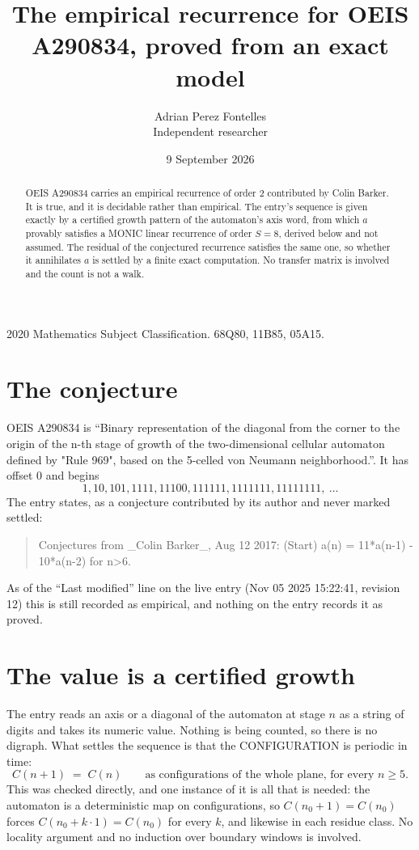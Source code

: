 \documentclass[11pt,a4paper]{article}
\title{The empirical recurrence for OEIS A290834, proved from an exact model}
\author{Adrian Perez Fontelles\\ \small Independent researcher}
\date{9 September 2026}
\theoremstyle{plain}
\theoremstyle{definition}
\begin{document}
\maketitle

\begin{abstract}
OEIS A290834 carries an empirical recurrence of order $2$ contributed by Colin Barker. It is true, and it is
decidable rather than empirical. The entry's sequence is given exactly by a certified growth pattern of the automaton's axis word, from
which $a$ provably satisfies a MONIC linear recurrence of order $S=8$, derived below and not
assumed. The residual of the conjectured recurrence satisfies the same one, so whether it
annihilates $a$ is settled by a finite exact computation. No transfer matrix is involved and
the count is not a walk.
\end{abstract}

\noindent\small 2020 Mathematics Subject Classification. 68Q80, 11B85, 05A15.\normalsize

\section{The conjecture}

OEIS A290834 is ``Binary representation of the diagonal from the corner to the origin of the n-th stage of growth of the two-dimensional cellular automaton defined by "Rule 969", based on the 5-celled von Neumann neighborhood.''. It has offset $0$ and begins
\[
1, 10, 101, 1111, 11100, 111111, 1111111, 11111111,\ \dots
\]
The entry states, as a conjecture contributed by its author and never marked settled:
\begin{quote}
Conjectures from \_Colin Barker\_, Aug 12 2017: (Start) a(n) = 11*a(n-1) - 10*a(n-2) for n>6.
\end{quote}
As of the ``Last modified'' line on the live entry (Nov 05 2025 15:22:41, revision 12)
this is still recorded as empirical, and nothing on the entry records it as proved.

\section{The value is a certified growth}

The entry reads an axis or a diagonal of the automaton at stage $n$ as a string of digits and
takes its numeric value. Nothing is being counted, so there is no digraph. What settles the
sequence is that the CONFIGURATION is periodic in time:
\[
C(n+1)\;=\;C(n)\qquad\text{as configurations of the whole plane, for every } n\ge 5.
\]
This was checked directly, and one instance of it is all that is needed: the automaton is a
deterministic map on configurations, so $C(n_0+1)=C(n_0)$ forces $C(n_0+k\cdot1)=C(n_0)$ for
every $k$, and likewise in each residue class. No locality argument and no induction over
boundary windows is involved.
\end{document}

